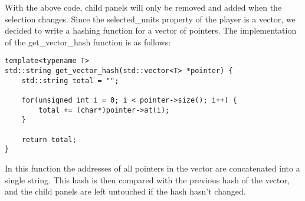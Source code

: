 With the above code, child panels will only be removed and added when the
selection changes. Since the selected\_units property of the player is a
vector, we decided to write a hashing function for a vector of pointers. The
implementation of the get\_vector\_hash function is as follows:

\begin{lstlisting}[caption={Vector hash}] 
template<typename T> 
std::string get_vector_hash(std::vector<T> *pointer) { 
    std::string total = "";

    for(unsigned int i = 0; i < pointer->size(); i++) { 
        total += (char*)pointer->at(i); 
    }

    return total; 
} 
\end{lstlisting}

In this function the addresses of all pointers in the vector are concatenated
into a single string. This hash is then compared with the previous hash of the
vector, and the child panels are left untouched if the hash hasn't changed.
